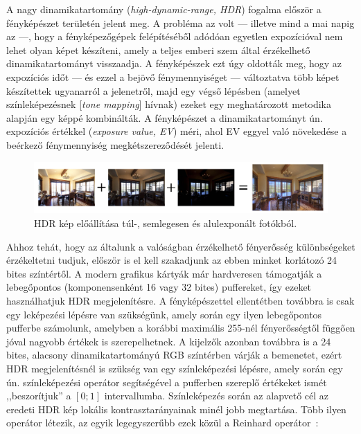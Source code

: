 A nagy dinamikatartomány (\textit{high-dynamic-range, HDR}) fogalma először a fényképészet területén jelent meg. A probléma az volt --- illetve mind a mai napig az ---, hogy a fényképezőgépek felépítéséből adódóan egyetlen expozícióval nem lehet olyan képet készíteni, amely a teljes emberi szem által érzékelhető dinamikatartományt visszaadja. A fényképészek ezt úgy oldották meg, hogy az expozíciós időt --- és ezzel a bejövő fénymennyiséget --- változtatva több képet készítettek ugyanarról a jelenetről, majd egy végső lépésben (amelyet színleképezésnek [\textit{tone mapping}] hívnak) ezeket egy meghatározott metodika alapján egy képpé kombinálták. A fényképészet a dinamikatartományt ún. expozíciós értékkel (\textit{exposure value, EV}) méri, ahol EV eggyel való növekedése a beérkező fénymennyiség megkétszereződését jelenti.

\begin{figure}[!ht]
    \centering
    \includegraphics[width=1.0\textwidth]{images/hdr_process.png}
    \caption{HDR kép előállítása túl-, semlegesen és alulexponált fotókból.}
\end{figure}

Ahhoz tehát, hogy az általunk a valóságban érzékelhető fényerősség különbségeket érzékeltetni tudjuk, először is el kell szakadjunk az ebben minket korlátozó 24 bites színtértől. A modern grafikus kártyák már hardveresen támogatják a lebegőpontos (komponensenként 16 vagy 32 bites) puffereket, így ezeket használhatjuk HDR megjelenítésre. A fényképészettel ellentétben továbbra is csak egy leképezési lépésre van szükségünk, amely során egy ilyen lebegőpontos pufferbe számolunk, amelyben a korábbi maximális 255-nél fényerősségtől függően jóval nagyobb értékek is szerepelhetnek. A kijelzők azonban továbbra is a 24 bites, alacsony dinamikatartományú RGB színtérben várják a bemenetet, ezért HDR megjelenítésnél is szükség van egy színleképezési lépésre, amely során egy ún. színleképezési operátor segítségével a pufferben szereplő értékeket ismét ,,beszorítjuk'' a \([0; 1]\) intervallumba. Színleképezés során az alapvető cél az eredeti HDR kép lokális kontrasztarányainak minél jobb megtartása. Több ilyen operátor létezik, az egyik legegyszerűbb ezek közül a Reinhard operátor~\cite{reinhard2002photographic}:

